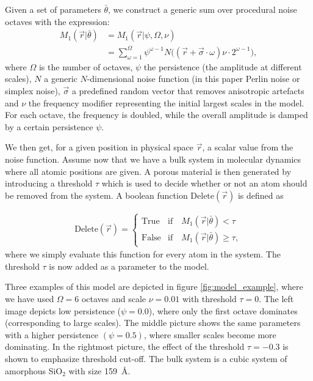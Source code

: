 \documentclass[aps,pre,twocolumn,letterpaper,floatfix,showpacs]{revtex4}
\begin{document}
Given a set of parameters $\bar \theta$, we construct a generic sum over procedural noise octaves with the expression:
\begin{align}
  M_1(\vec r |\bar \theta) &= M_1(\vec r | \psi, \Omega, \nu)\nonumber\\
  &= \sum_{\omega=1}^{\Omega} \psi^{\omega-1}   N\big((\vec r + \vec\sigma \cdot \omega)\nu \cdot 2^{\omega-1} \big),
\label{eq:noisemodel1}
\end{align}
where $\Omega$ is the number of octaves, $\psi$ the persistence (the amplitude at different scales),
$N$ a generic $N$-dimensional noise function (in this paper Perlin noise or simplex noise), $\vec \sigma$ a predefined random
vector that removes anisotropic artefacts and $\nu$ the frequency modifier representing
the initial largest scales in the model. For each octave, the frequency is doubled, while the overall amplitude is damped by a certain persistence $\psi$.

We then get, for a given position in physical space $\vec r$, a scalar value from the noise function.
Assume now that we have a bulk system in molecular dynamics where all atomic positions are given.
A porous material is then generated by introducing a threshold $\tau$ which is used to decide whether or not an atom should be removed from the system.
A boolean function $\text{Delete}(\vec r)$ is defined as

\begin{align}
  \text{Delete}(\vec r) = 
  \begin{cases} 
    \text{True} & \text{if} \quad M_1(\vec r |\bar \theta) < \tau \\
    \text{False} & \text{if} \quad M_1(\vec r |\bar \theta) \geq \tau,
  \end{cases}
  \label{eq:delete_threshold}
\end{align}
where we simply evaluate this function for every atom in the system.
The threshold $\tau$ is now added as a parameter to the model.

Three examples of this model are depicted in figure \ref{fig:model_example}, where we have
used $\Omega=6$ octaves and scale $\nu=0.01$ with threshold $\tau=0$. The left
image depicts low persistence ($\psi = 0.0$), where only the first octave dominates
(corresponding to large scales). The middle picture shows the same parameters with
a higher persistence $(\psi = 0.5)$, where smaller scales become more dominating.
In the rightmost picture, the effect of the threshold $\tau = -0.3$ is shown to emphasize threshold cut-off.
The bulk system is a cubic system of amorphous SiO$_2$ with size \SI{159}{\angstrom}.
\end{document}
